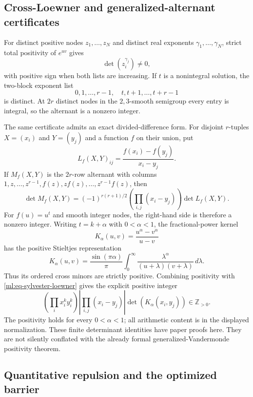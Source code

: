 \documentclass[11pt,oneside]{article}
\theoremstyle{definition}
\theoremstyle{remark}
\newcommand{\Z}{\mathbb Z}
\begin{document}
\subsection{Cross-Loewner and generalized-alternant certificates}
\label{ml:loewner}

For distinct positive nodes $z_1,\ldots,z_N$ and distinct real exponents
$\gamma_1,\ldots,\gamma_N$, strict total positivity of $e^{uv}$ gives
\[
 \det(z_i^{\gamma_j})\ne0,
\]
with positive sign when both lists are increasing.  If $t$ is a nonintegral solution, the
two-block exponent list
\begin{equation}
 0,1,\ldots,r-1,\quad t,t+1,\ldots,t+r-1
 \label{ml:eq-two-block-exponents}
\end{equation}
is distinct.  At $2r$ distinct nodes in the $2,3$-smooth semigroup every entry is integral,
so the alternant is a nonzero integer.

The same certificate admits an exact divided-difference form.  For disjoint $r$-tuples
$X=(x_i)$ and $Y=(y_j)$ and a function $f$ on their union, put
\[
 L_f(X,Y)_{ij}=\frac{f(x_i)-f(y_j)}{x_i-y_j}.
\]
If $M_f(X,Y)$ is the $2r$-row alternant with columns
$1,z,\ldots,z^{r-1},f(z),zf(z),\ldots,z^{r-1}f(z)$, then
\begin{equation}
 \det M_f(X,Y)=(-1)^{r(r+1)/2}
 \left(\prod_{i,j}(x_i-y_j)\right)\det L_f(X,Y).
 \label{ml:eq-sylvester-loewner}
\end{equation}
For $f(u)=u^t$ and smooth integer nodes, the right-hand side is therefore a nonzero integer.
Writing $t=k+\alpha$ with $0<\alpha<1$, the fractional-power kernel
\[
 K_\alpha(u,v)=\frac{u^\alpha-v^\alpha}{u-v}
\]
has the positive Stieltjes representation
\[
 K_\alpha(u,v)=\frac{\sin(\pi\alpha)}\pi
 \int_0^\infty\frac{\lambda^\alpha}{(u+\lambda)(v+\lambda)}\,d\lambda.
\]
Thus its ordered cross minors are strictly positive.  Combining positivity with
\eqref{ml:eq-sylvester-loewner} gives the explicit positive integer
\begin{equation}
 \left(\prod_i x_i^k y_i^k\right)
 \left|\prod_{i,j}(x_i-y_j)\right|
 \det(K_\alpha(x_i,y_j))\in\Z_{>0}.
 \label{ml:eq-positive-loewner-integer}
\end{equation}
The positivity holds for every $0<\alpha<1$; all arithmetic content is in the displayed
normalization.  These finite determinant identities have paper proofs here.  They are not
silently conflated with the already formal generalized-Vandermonde positivity theorem.

\subsection{Quantitative repulsion and the optimized barrier}
\label{ml:one-half}
\end{document}
